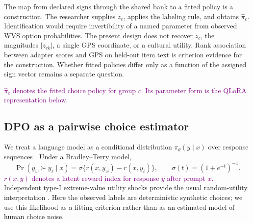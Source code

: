 The map from declared signs through the shared bank to a fitted policy is a construction. The researcher supplies $z_c$, applies the labeling rule, and obtains $\widehat\pi_c$. Identification would require invertibility of a named parameter from observed WVS option probabilities. The present design does not recover $z_c$, the magnitudes $|z_{ck}|$, a single GPS coordinate, or a cultural utility. Rank association between adapter scores and GPS on held-out item text is criterion evidence for the construction. Whether fitted policies differ only as a function of the assigned sign vector remains a separate question.

\textcolor{purple}{$\widehat\pi_c$ denotes the fitted choice policy for group $c$. Its parameter form is the QLoRA representation below.}

\subsection{DPO as a pairwise choice estimator}
We treat a language model as a conditional distribution $\pi_\theta(y\mid x)$ over response sequences \cite{ludwig2026}. Under a Bradley--Terry model,
\begin{equation}
\Pr(y_w\succ y_\ell\mid x)=\sigma\{r(x,y_w)-r(x,y_\ell)\},\qquad \sigma(t)=(1+e^{-t})^{-1}.
\end{equation}
\textcolor{purple}{$r(x,y)$ denotes a latent reward index for response $y$ after prompt $x$.}
Independent type-I extreme-value utility shocks provide the usual random-utility interpretation \cite{bradleyterry1952}. Here the observed labels are deterministic synthetic choices; we use this likelihood as a fitting criterion rather than as an estimated model of human choice noise.

